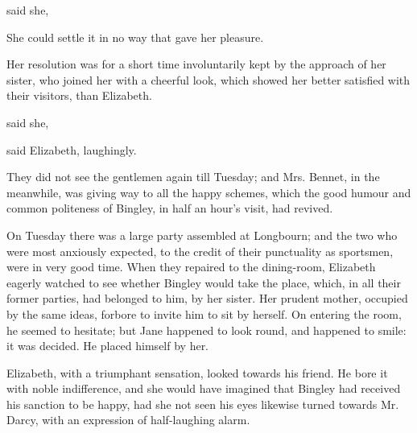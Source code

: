  said she, 

She could settle it in no way that gave her pleasure.


Her resolution was for a short time involuntarily kept by the approach of her sister, who joined her with a cheerful look, which showed her better satisfied with their visitors, than Elizabeth.

 said she, 

 said Elizabeth, laughingly. 



They did not see the gentlemen again till Tuesday; and Mrs. Bennet, in the meanwhile, was giving way to all the happy schemes, which the good humour and common politeness of Bingley, in half an hour's visit, had revived.

On Tuesday there was a large party assembled at Longbourn; and the two who were most anxiously expected, to the credit of their punctuality as sportsmen, were in very good time. When they repaired to the dining-room, Elizabeth eagerly watched to see whether Bingley would take the place, which, in all their former parties, had belonged to him, by her sister. Her prudent mother, occupied by the same ideas, forbore to invite him to sit by herself. On entering the room, he seemed to hesitate; but Jane happened to look round, and happened to smile: it was decided. He placed himself by her.

Elizabeth, with a triumphant sensation, looked towards his friend. He bore it with noble indifference, and she would have imagined that Bingley had received his sanction to be happy, had she not seen his eyes likewise turned towards Mr. Darcy, with an expression of half-laughing alarm.

